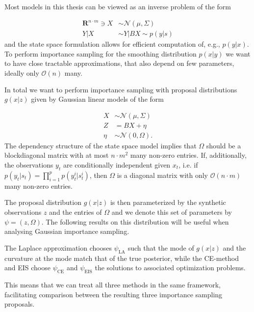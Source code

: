 Most models in this thesis can be viewed as an inverse problem of the form

\begin{align*}
    \mathbf{R}^{n\cdot m} \ni X & \sim \mathcal N(\mu, \Sigma) \\
    Y|X                         & \sim Y|BX \sim p(y|s)
\end{align*}
and the state space formulation allows for efficient computation of, e.g., $p(y|x)$.
To perform importance sampling for the smoothing distribution $p(x|y)$ we want to have close tractable approximations, that also depend on few parameters, ideally only $\mathcal O(n)$ many.


In total we want to perform importance sampling with proposal distributions $g(x|z)$ given by Gaussian linear models of the form

\begin{align*}
    X    & \sim \mathcal N(\mu, \Sigma) \\
    Z    & = BX + \eta                  \\
    \eta & \sim \mathcal N(0, \Omega).
\end{align*}
The dependency structure of the state space model implies that $\Omega$ should be a blockdiagonal matrix with at most $n \cdot m^{2}$ many non-zero entries.
If, additionally, the observations $y_{t}$ are conditionally independent given $x_{t}$, i.e. if $p(y_{t}|s_{t}) = \prod_{i = 1}^{p} p(y_{t}^{i}|s_{t}^i)$, then $\Omega$ is a diagonal matrix with only $\mathcal O(n \cdot m)$ many non-zero entries.

The proposal distribution $g(x|z)$ is then parameterized by the synthetic observations $z$ and the entries of $\Omega$ and we denote this set of parameters by $\psi = (z, \Omega)$.
The following results on this distribution will be useful when analysing Gaussian importance sampling.

The Laplace approximation chooses $\psi_{\text{LA}}$ such that the mode of $g(x|z)$ and the curvature at the mode match that of the true posterior, while the CE-method and EIS choose $\psi_{\text{CE}}$ and $\psi_{\text{EIS}}$ the solutions to associated optimization problems.

This means that we can treat all three methods in the same framework, facilitating comparison between the resulting three importance sampling proposals.



